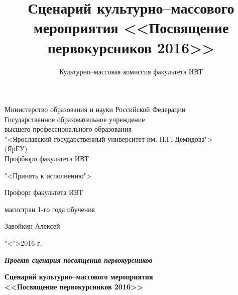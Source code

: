 \documentclass[a4paper, 14pt]{extarticle}
\title{Сценарий культурно--массового мероприятия <<Посвящение первокурсников 2016>>}
\author{Культурно--массовая комиссия факультета ИВТ}
\theoremstyle{definition}
\begin{document}
\setcounter{tocdepth}{3}

\makeatletter
\AtEndDocument{%
	\addtocounter{totfigures}{\value{figure}}%
	\addtocounter{tottables}{\value{table}}%
	\addtocounter{totsections}{\value{section}}%
	\immediate\write\@mainaux{%
		\string\gdef\string\totfig{\number\value{totfigures}}%
		\string\gdef\string\tottab{\number\value{tottables}}%
		\string\gdef\string\totsections{\number\value{totsections}}%
	}%
}
\makeatother


{
\thispagestyle{empty}

\begin{center}
	
	Министерство образования и науки Российской Федерации\\[0.3cm]
	Государственное образовательное учреждение\\
	высшего профессионального образования\\
	"<Ярославский государственный университет им. П.Г. Демидова">\\
	(ЯрГУ)\\[0.3cm]
	
	Профбюро факультета ИВТ
	
	\bigskip
	\bigskip	
	
	\hspace{15em}"<Принять к исполнению">
	
	\begin{flushright}
		Профорг факультета ИВТ\par
		магистран 1-го года обучения\par
		\underline{\hspace{3.2cm}}Завойкин Алексей\par
		"<\underline{\hspace{0.5cm}}">\underline{\hspace{3.4cm}}2016 г.\par
	\end{flushright}
	
	\bigskip
	
	{\textbf
		{\textit
			{Проект сценария посвящения первокурсников}
		}
	}
	\\
	
	\bigskip
	\bigskip
	
	{\bf
		Сценарий культурно--массового мероприятия\\<<Посвящение первокурсников 2016>> 
	}
\end{center}

}
\end{document}
